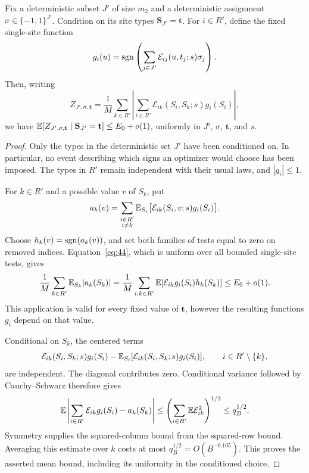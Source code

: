 \begin{lemma}
\label{lem:sampling-conditional-mean}
Fix a deterministic subset $J'$ of size $m_2$ and a deterministic
assignment $\sigma\in\{-1,1\}^{J'}$.  Condition on its site types
$\mathbf S_{J'}=\mathbf t$.  For $i\in R'$, define the fixed
single-site function
\[
 g_i(u)=\operatorname{sgn}\left(\sum_{j\in J'}
                 \mathcal E_{ij}(u,t_j;s)\sigma_j\right).
\]
Then, writing
\[
 Z_{J',\sigma,\mathbf t}
   =\frac1M\sum_{k\in R'}
       \left|\sum_{i\in R'}\mathcal E_{ik}(S_i,S_k;s)g_i(S_i)\right|,
\]
we have
$\mathbb E[Z_{J',\sigma,\mathbf t}\mid\mathbf S_{J'}=\mathbf t]
\le E_0+o(1)$, uniformly in $J'$, $\sigma$, $\mathbf t$, and $s$.
\end{lemma}

\begin{proof}
Only the types in the deterministic set $J'$ have been conditioned
on.  In particular, no event describing which signs an optimizer
would choose has been imposed.  The types in $R'$ remain independent
with their usual laws, and $|g_i|\le1$.

For $k\in R'$ and a possible value $v$ of $S_k$, put
\[
 a_k(v)=\sum_{\substack{i\in R'\\ i\ne k}}
             \mathbb E_{S_i}\big[\mathcal E_{ik}(S_i,v;s)g_i(S_i)\big].
\]
Choose $h_k(v)=\operatorname{sgn}(a_k(v))$, and set both families of tests
equal to zero on removed indices.  Equation~\eqref{eq:44},
which is uniform over all bounded single-site tests, gives
\[
 \frac1M\sum_{k\in R'}\mathbb E_{S_k}|a_k(S_k)|
 =\frac1M\sum_{i,k\in R'}
       \mathbb E[\mathcal E_{ik}g_i(S_i)h_k(S_k)]
 \le E_0+o(1).
\]
This application is valid for every fixed value of $\mathbf t$,
however the resulting functions $g_i$ depend on that value.

Conditional on $S_k$, the centered terms
\[
 \mathcal E_{ik}(S_i,S_k;s)g_i(S_i)
  -\mathbb E_{S_i}[\mathcal E_{ik}(S_i,S_k;s)g_i(S_i)],
       \qquad i\in R'\setminus\{k\},
\]
are independent.  The diagonal contributes zero.  Conditional
variance followed by Cauchy--Schwarz therefore gives
\[
 \mathbb E\left|\sum_{i\in R'}\mathcal E_{ik}g_i(S_i)-a_k(S_k)\right|
 \le\left(\sum_{i\in R'}\mathbb E\mathcal E_{ik}^2\right)^{1/2}
 \le q_B^{1/2}.
\]
Symmetry supplies the squared-column bound from the squared-row
bound.  Averaging this estimate over $k$ costs at most
$q_B^{1/2}=O(B^{-0.105})$.  This proves the asserted mean bound,
including its uniformity in the conditioned choice.
\end{proof}

